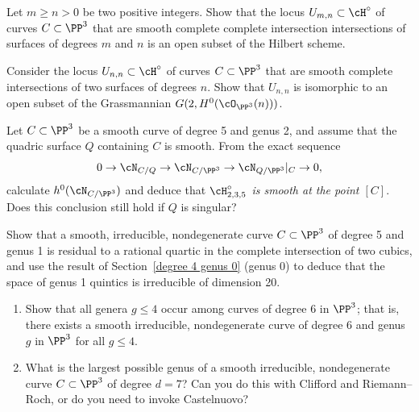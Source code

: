\begin{exercise}\label{complete intersection open}
Let $m \geq n >0$ be two positive integers. Show that the locus $U_{m,n}
\subset \cH^\circ$ of curves $C \subset \PP^3$ that are smooth complete
complete intersection
intersections of surfaces of degrees $m$ and $n$ is an open subset of
the Hilbert scheme.
\end{exercise}

\begin{exercise}\label{first complete intersection exercise}
Consider  the locus $U_{n,n} \subset \cH^\circ$ of curves $C \subset
\PP^3$ that are smooth complete intersections of two surfaces of degrees
$n$. Show that $U_{n,n}$
is isomorphic to an open subset of the Grassmannian $G(2,
H^0(\cO_{\PP^3}(n)))$.
\end{exercise}

\begin{exercise}
Let $C \subset \PP^3$ be a smooth curve of degree 5 and genus 2, and
assume that the quadric surface $Q$ containing $C$ is smooth. From the
exact sequence
$$
0 \to \cN_{C/Q} \to  \cN_{C/\PP^3} \to  \cN_{Q/\PP^3}|_C \to 0,
$$
calculate $h^0(\cN_{C/\PP^3})$ and deduce that \emph{$\cH^\circ_{2,3,5}$
is smooth at the point $[C]$}. Does  this conclusion still hold if $Q$
%
is singular?
\end{exercise}

\begin{exercise}\label{quintics genus 1}
Show that a smooth, irreducible, nondegenerate curve $C \subset \PP^3$
of degree 5 and genus 1 is residual to a rational quartic in the complete
intersection of two cubics, and use the result of
Section~\ref{degree 4 genus 0} (genus 0)
to deduce that the space of genus 1 quintics is irreducible
of dimension 20.
\end{exercise}

\begin{exercise}
\begin{enumerate}
\item Show that all genera $g \leq 4$  occur among curves of degree 6
in $\PP^3$; that is, there exists a smooth irreducible, nondegenerate
curve of degree 6 and genus $g$ in $\PP^3$ for all $g \leq 4$.
\item What is the largest possible genus of a smooth irreducible,
nondegenerate curve $C \subset \PP^3$ of degree $d=7$? Can you do this
with Clifford and Riemann--Roch, or do you need to invoke Castelnuovo?
\end{enumerate}
\end{exercise}

